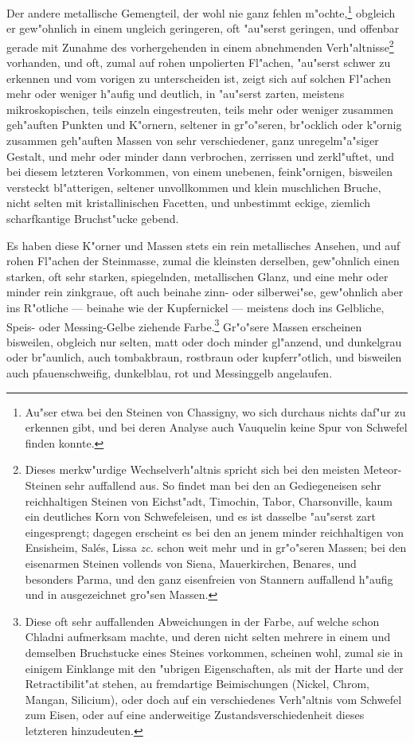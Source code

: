 \documentclass[a4paper, 11pt, oneside, german]{article}
\begin{document}
Der andere metallische Gemengteil, der wohl nie ganz fehlen m"ochte,\footnote{Au"ser etwa bei den Steinen von Chassigny, wo sich durchaus nichts daf"ur zu erkennen gibt, und bei deren Analyse auch Vauquelin keine Spur von Schwefel finden konnte.} obgleich er gew"ohnlich in einem ungleich geringeren, oft "au"serst geringen, und offenbar gerade mit Zunahme des vorhergehenden in einem abnehmenden Verh"altnisse\footnote{Dieses merkw"urdige Wechselverh"altnis spricht sich bei den meisten Meteor-Steinen sehr auffallend aus. So findet man bei den an Gediegeneisen sehr reichhaltigen Steinen von Eichst"adt, Timochin, Tabor, Charsonville, kaum ein deutliches Korn von Schwefeleisen, und es ist dasselbe "au"serst zart eingesprengt; dagegen erscheint es bei den an jenem minder reichhaltigen von Ensisheim, Salés, Lissa \emph{zc.} schon weit mehr und in gr"o"seren Massen; bei den eisenarmen Steinen vollends von Siena, Mauerkirchen, Benares, und besonders Parma, und den ganz eisenfreien von Stannern auffallend h"aufig und in ausgezeichnet gro"sen Massen.} vorhanden, und oft, zumal auf rohen unpolierten Fl"achen, "au"serst schwer zu erkennen und vom vorigen zu unterscheiden ist, zeigt sich auf solchen Fl"achen mehr oder weniger h"aufig und deutlich, in "au"serst zarten, meistens mikroskopischen, teils einzeln eingestreuten, teils mehr oder weniger zusammen geh"auften Punkten und K"ornern, seltener in gr"o"seren, br"ocklich oder k"ornig zusammen geh"auften Massen von sehr verschiedener, ganz unregelm"a"siger Gestalt, und mehr oder minder dann verbrochen, zerrissen und zerkl"uftet, und bei diesem letzteren Vorkommen, von einem unebenen, feink"ornigen, bisweilen versteckt bl"atterigen, seltener unvollkommen und klein muschlichen Bruche, nicht selten mit kristallinischen Facetten, und unbestimmt eckige, ziemlich scharfkantige Bruchst"ucke gebend.

Es haben diese K"orner und Massen stets ein rein metallisches Ansehen, und auf rohen Fl"achen der Steinmasse, zumal die kleinsten derselben, gew"ohnlich einen starken, oft sehr starken, spiegelnden, metallischen Glanz, und eine mehr oder minder rein zinkgraue, oft auch beinahe zinn- oder silberwei"se, gew"ohnlich aber ins R"otliche --- beinahe wie der Kupfernickel --- meistens doch ins Gelbliche, Speis- oder Messing-Gelbe ziehende Farbe.\footnote{Diese oft sehr auffallenden Abweichungen in der Farbe, auf welche schon Chladni aufmerksam machte, und deren nicht selten mehrere in einem und demselben Bruchstucke eines Steines vorkommen, scheinen wohl, zumal sie in einigem Einklange mit den "ubrigen Eigenschaften, als mit der Harte und der Retractibilit"at stehen, au fremdartige Beimischungen (Nickel, Chrom, Mangan, Silicium), oder doch auf ein verschiedenes Verh"altnis vom Schwefel zum Eisen, oder auf eine anderweitige Zustandsverschiedenheit dieses letzteren hinzudeuten.} Gr"o"sere Massen erscheinen bisweilen, obgleich nur selten, matt oder doch minder gl"anzend, und dunkelgrau oder br"aunlich, auch tombakbraun, rostbraun oder kupferr"otlich, und bisweilen auch pfauenschweifig, dunkelblau, rot und Messinggelb angelaufen.
\end{document}
